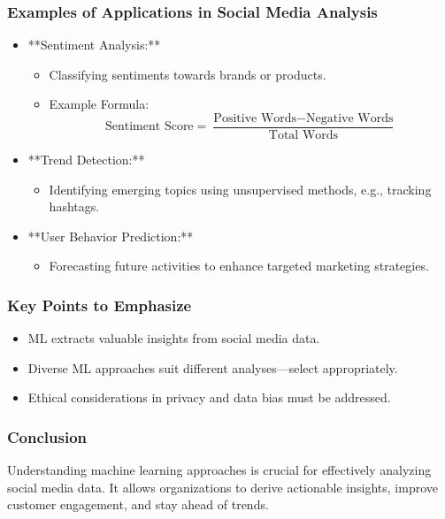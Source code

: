 \documentclass{beamer}
\begin{document}
\begin{frame}[fragile]
    \frametitle{Examples of Applications in Social Media Analysis}
    \begin{itemize}
        \item **Sentiment Analysis:**
            \begin{itemize}
                \item Classifying sentiments towards brands or products.
                \item Example Formula: 
                \begin{equation}
                    \text{Sentiment Score} = \frac{\text{Positive Words} - \text{Negative Words}}{\text{Total Words}}
                \end{equation}
            \end{itemize}
        \item **Trend Detection:**
            \begin{itemize}
                \item Identifying emerging topics using unsupervised methods, e.g., tracking hashtags.
            \end{itemize}
        \item **User Behavior Prediction:**
            \begin{itemize}
                \item Forecasting future activities to enhance targeted marketing strategies.
            \end{itemize}
    \end{itemize}
\end{frame}

\begin{frame}[fragile]
    \frametitle{Key Points to Emphasize}
    \begin{itemize}
        \item ML extracts valuable insights from social media data.
        \item Diverse ML approaches suit different analyses—select appropriately.
        \item Ethical considerations in privacy and data bias must be addressed.
    \end{itemize}
\end{frame}

\begin{frame}[fragile]
    \frametitle{Conclusion}
    Understanding machine learning approaches is crucial for effectively analyzing social media data. It allows organizations to derive actionable insights, improve customer engagement, and stay ahead of trends.
\end{frame}
\end{document}
